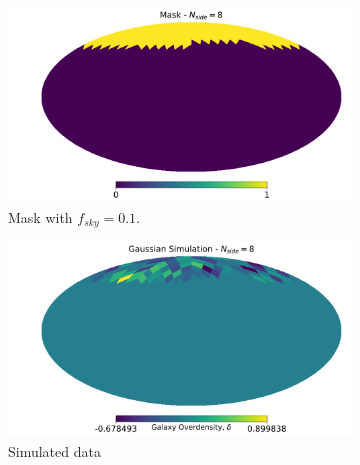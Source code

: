 \begin{figure}
\begin{subfigure}[b]{.5\textwidth}
 \includegraphics[scale=0.33]{BPL-FIGS/RandomBand_fsky_mask.pdf}
  \caption{Mask with $f_{sky} = 0.1$.}
  \label{fig:BPL:PoleMask}
\end{subfigure}
\begin{subfigure}[b]{.5\textwidth}
 \includegraphics[scale=0.34]{BPL-FIGS/RandomBand_fsky_map.pdf}
  \caption{Simulated data}
  \label{fig:BPL:PoleMap}
\end{subfigure}\\
\begin{subfigure}[b]{\textwidth}

\end{subfigure}
\end{figure}

